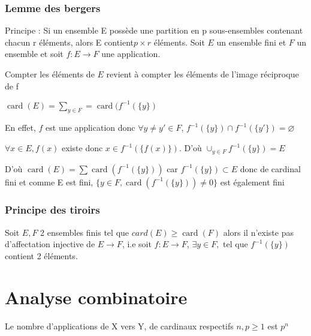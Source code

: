 \documentclass[french]{yLectureNote}
\DeclareMathOperator{\card}{card}
\begin{document}
\subsubsection{Lemme des bergers}
\begin{lemma}

Principe : Si un ensemble E possède une partition en p sous-ensembles contenant chacun r éléments, alors E contient$ p \times r$ éléments.
Soit $E$ un ensemble fini et $F$ un ensemble et soit $f:E\to F$ une application.\label{bergers}

Compter les éléments de $E$ revient à compter les éléments de l'image réciproque de f

$\card(E) = \sum_{y\in F} = \card(f^{-1}(\{y\})$

En effet, $f$ est une application donc $\forall y \neq y' \in F$, $f^{-1}(\{y\}) \cap f^{-1}(\{y'\}) = \varnothing$ %

$\forall x\in E, f(x)$ existe donc $x\in f^{-1}(\{f(x)\})$. D'où $\cup_{y\in F} f^{-1}(\{y\}) = E$

D'où $\card(E) = \sum \card(f^{-1}(\{y\}))$ car $f^{-1}(\{y\}) \subset E$ donc de cardinal fini et comme E est fini, $\{y\in F, \card(f^{-1}(\{y\})) \neq 0\}$ est également fini
\end{lemma}
\subsubsection{Principe des tiroirs}
\begin{lemma}

Soit $E,F$ 2 ensembles finis tel que $card(E) \geq \card(F)$ alors il n'existe pas d'affectation injective de $E\to F$, i.e soit $f:E\to F$, $\exists y\in F,$ tel que  $f^{-1}(\{y\})$ contient 2 éléments.\label{tiroirs}
\end{lemma}
\section{Analyse combinatoire}
\begin{theorem}[]\label{comb_1}
Le nombre d'applications de X vers Y, de cardinaux respectifs $n,p\geq 1$ est $p^n$
\end{theorem}
\end{document}
